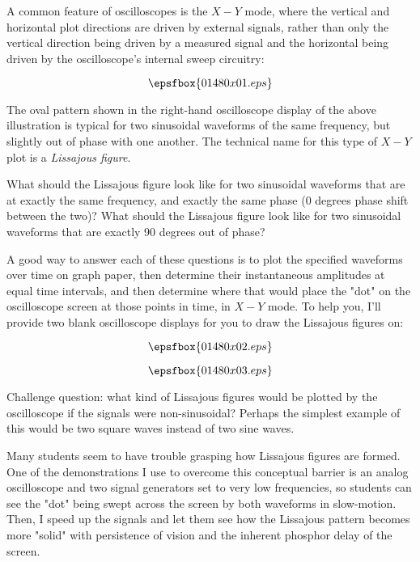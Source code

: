 

A common feature of oscilloscopes is the $X-Y$ mode, where the vertical and horizontal plot directions are driven by external signals, rather than only the vertical direction being driven by a measured signal and the horizontal being driven by the oscilloscope's internal sweep circuitry:

$$\epsfbox{01480x01.eps}$$

The oval pattern shown in the right-hand oscilloscope display of the above illustration is typical for two sinusoidal waveforms of the same frequency, but slightly out of phase with one another.  The technical name for this type of $X-Y$ plot is a {\it Lissajous figure}.

What should the Lissajous figure look like for two sinusoidal waveforms that are at exactly the same frequency, and exactly the same phase (0 degrees phase shift between the two)?  What should the Lissajous figure look like for two sinusoidal waveforms that are exactly 90 degrees out of phase?

A good way to answer each of these questions is to plot the specified waveforms over time on graph paper, then determine their instantaneous amplitudes at equal time intervals, and then determine where that would place the "dot" on the oscilloscope screen at those points in time, in $X-Y$ mode.  To help you, I'll provide two blank oscilloscope displays for you to draw the Lissajous figures on:

$$\epsfbox{01480x02.eps}$$







$$\epsfbox{01480x03.eps}$$

\vskip 10pt

Challenge question: what kind of Lissajous figures would be plotted by the oscilloscope if the signals were non-sinusoidal?  Perhaps the simplest example of this would be two square waves instead of two sine waves.







Many students seem to have trouble grasping how Lissajous figures are formed.  One of the demonstrations I use to overcome this conceptual barrier is an analog oscilloscope and two signal generators set to very low frequencies, so students can see the "dot" being swept across the screen by both waveforms in slow-motion.  Then, I speed up the signals and let them see how the Lissajous pattern becomes more "solid" with persistence of vision and the inherent phosphor delay of the screen.




